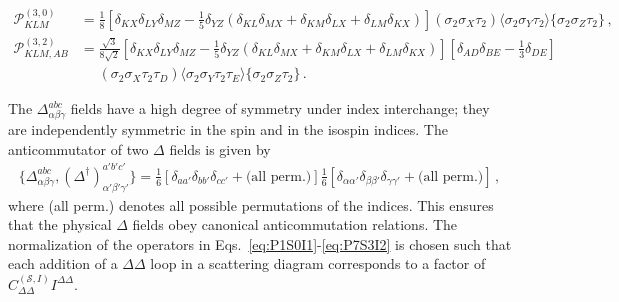 \documentclass[nofootinbib, preprint, aps, prc, superscriptaddress,11pt]{revtex4-1}
\newcommand{\1}{\mathbbm{1}}
\newcommand{\D}{\ensuremath{\Delta}\xspace}
\newcommand{\DD}{\ensuremath{\Delta\Delta}\xspace}
\begin{document}
\begin{align}
\mathscr{P}^{(3,0)}_{KLM} & = 
        \frac{1}{8} \left[ \delta_{KX}\delta_{LY}\delta_{MZ} - \frac{1}{5}\delta_{YZ}(\delta_{KL}\delta_{MX}+\delta_{KM}\delta_{LX}+\delta_{LM}\delta_{KX}) \right] 
        (\sigma_2\sigma_X\tau_2)\langle\sigma_2\sigma_Y\tau_2\rangle \{\sigma_2\sigma_Z\tau_2 \} \, , \\
\mathscr{P}^{(3,2)}_{KLM,AB} & =  
        \frac{\sqrt{3}}{8\sqrt{2}} 
        \left[ \delta_{KX}\delta_{LY}\delta_{MZ} - \frac{1}{5}\delta_{YZ}(\delta_{KL}\delta_{MX}+\delta_{KM}\delta_{LX}+\delta_{LM}\delta_{KX}) \right]  \left[ \delta_{AD}\delta_{BE} - \frac{1}{3}\delta_{DE} \right]\nonumber\\
    &\mathrel{\phantom{=}}(\sigma_2\sigma_X\tau_2\tau_D)\langle\sigma_2\sigma_Y\tau_2\tau_E\rangle \{\sigma_2\sigma_Z\tau_2 \} \, \label{eq:P7S3I2} .
\end{align}


The $\D^{abc}_{\alpha\beta\gamma}$ fields have a high degree of symmetry under index interchange; they are independently symmetric in the spin and in the isospin indices. The anticommutator of two \D fields is given by
\begin{align}
    \{\D^{abc}_{\alpha\beta\gamma},(\D^\dagger)^{a'b'c'}_{\alpha'\beta'\gamma'} \} = \frac{1}{6}\left[\delta_{aa'}\delta_{bb'}\delta_{cc'} + \text{(all perm.)}\right] \frac{1}{6}\left[\delta_{\alpha\alpha'}\delta_{\beta\beta'}\delta_{\gamma\gamma'} + \text{(all perm.)} \right] \, ,
\end{align}
where (all perm.) denotes all possible permutations of the indices. This ensures that the physical \D fields obey canonical anticommutation relations.
The normalization of the operators in Eqs.~\eqref{eq:P1S0I1}-\eqref{eq:P7S3I2} is chosen such that each addition of a \DD loop in a scattering diagram corresponds to a factor of $C_{\DD}^{(\mathscr{S},I)} I^{\DD}$.






\end{document}
